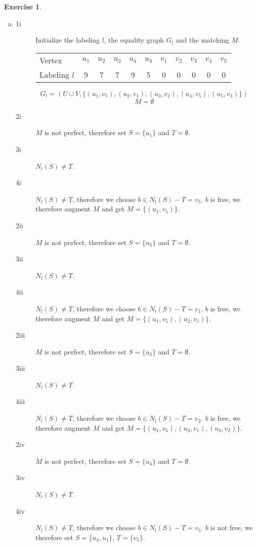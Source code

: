 \documentclass[a4paper,12pt,headsepline]{scrartcl}
\newtheorem{aufgabe}{Exercise}
\begin{document}
\begin{aufgabe}
\end{aufgabe}

\begin{enumerate}[a)]
  \item
    \begin{description}
      \item [1i] Initialize the labeling $l$, the equality graph $G_l$ and the matching $M$.
        \begin{center}
          \begin{tabular}{lcccccccccc}
            Vertex & $u_1$ & $u_2$ & $u_3$ & $u_4$ & $u_5$ & $v_1$ & $v_2$ & $v_3$ & $v_4$ & $v_5$ \\
            Labeling $l$ & 9 & 7 & 7 & 9 & 5 & 0 & 0 & 0 & 0 & 0
          \end{tabular}
        \end{center}
        \[ G_l = (U\cup V, \{ (u_1,v_5), (u_2,v_1), (u_3,v_2), (u_4,v_5), (u_5,v_3) \}) \]
        \[ M = \emptyset \]
      \item [2i] $M$ is not perfect, therefore set $S = \{ u_1 \}$ and $T = \emptyset$.
      \item [3i] $N_l(S)\neq T$.
      \item [4i] $N_l(S)\neq T$, therefore we choose $b \in N_l(S)-T = v_5$.
        $b$ is free, we therefore augment $M$ and get $M = \{ (u_1,v_5) \}$.
      \item [2ii] $M$ is not perfect, therefore set $S = \{ u_2 \}$ and $T = \emptyset$.
      \item [3ii] $N_l(S)\neq T$.
      \item [4ii] $N_l(S)\neq T$, therefore we choose $b \in N_l(S)-T = v_1$.
        $b$ is free, we therefore augment $M$ and get $M = \{ (u_1,v_5), (u_2,v_1) \}$.
      \item [2iii] $M$ is not perfect, therefore set $S = \{ u_3 \}$ and $T = \emptyset$.
      \item [3iii] $N_l(S)\neq T$.
      \item [4iii] $N_l(S)\neq T$, therefore we choose $b \in N_l(S)-T = v_2$.
        $b$ is free, we therefore augment $M$ and get $M = \{ (u_1,v_5), (u_2,v_1), (u_3,v_2) \}$.
      \item [2iv] $M$ is not perfect, therefore set $S = \{ u_4 \}$ and $T = \emptyset$.
      \item [3iv] $N_l(S)\neq T$.
      \item [4iv] $N_l(S)\neq T$, therefore we choose $b \in N_l(S)-T = v_5$.
        $b$ is not free, we therefore set $S = \{ u_4, u_1 \}$, $T = \{ v_5 \}$.

\end{description}
\end{enumerate}
\end{document}
